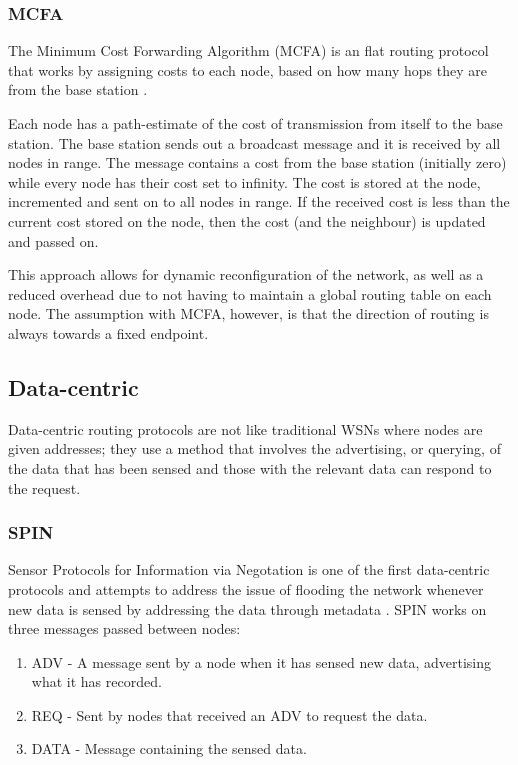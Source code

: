 \subsubsection{MCFA}
	The Minimum Cost Forwarding Algorithm (MCFA) is an flat routing protocol that works by assigning costs to each node, based on how many hops they are from the base station \cite{Chen2001}. 

Each node has a path-estimate of the cost of transmission from itself to the base station. The base station sends out a broadcast message and it is received by all nodes in range. The message contains a cost from the base station (initially zero) while every node has their cost set to infinity. The cost is stored at the node, incremented and sent on to all nodes in range. If the received cost is less than the current cost stored on the node, then the cost (and the neighbour) is updated and passed on.

	This approach allows for dynamic reconfiguration of the network, as well as a reduced overhead due to not having to maintain a global routing table on each node. The assumption with MCFA, however, is that the direction of routing is always towards a fixed endpoint.

\subsection{Data-centric}
	Data-centric routing protocols are not like traditional WSNs where nodes are given addresses; they use a method that involves the advertising, or querying, of the data that has been sensed and those with the relevant data can respond to the request.

\subsubsection{SPIN}
	Sensor Protocols for Information via Negotation  is one of the first data-centric protocols and attempts to address the issue of flooding the network whenever new data is sensed by addressing the data through metadata \cite{Heinzelman1999}. SPIN works on three messages passed between nodes:
	\begin{enumerate}
		\item ADV - A message sent by a node when it has sensed new data, advertising what it has recorded.
		\item REQ - Sent by nodes that received an ADV to request the data.
		\item DATA - Message containing the sensed data.
	\end{enumerate}

